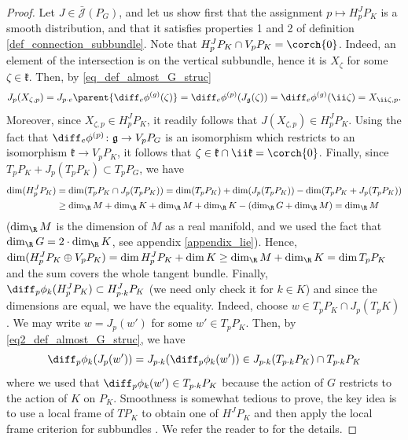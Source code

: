 \begin{proof}
    Let \(J \in \bar{\mathscr{J}}(P_G)\), and let us show first that the assignment \(p \mapsto H^J_pP_K\) is a smooth distribution, and that it satisfies properties 1 and 2 of definition \ref{def_connection_subbundle}. Note that \(H^J_pP_K \cap V_pP_K=\corch{0}\). Indeed, an element of the intersection is on the vertical subbundle, hence it is \(X_\zeta\) for some \(\zeta \in \mathfrak{k}\). Then, by \eqref{eq_def_almost_G_struc}
    \[
    J_p(X_{\zeta,p})= J_{p\cdot e}\parent{\diff_e\phi^{(g)}(\zeta)}=\diff_e\phi^{(p)}(J_\mathfrak{g}(\zeta)) =\diff_e\phi^{(g)}(\ii \zeta) =X_{\ii \zeta,p}.
    \]
    Moreover, since \(X_{\zeta,p} \in H^J_p P_K\), it readily follows that \(J(X_{\zeta,p})\in H_p^J P_K\). Using the fact that \(\diff_e\phi^{(p)}\colon \mathfrak{g}\to V_pP_G\) is an isomorphism which restricts to an isomorphism \(\mathfrak{k}\to V_pP_K\), it follows that \(\zeta \in \mathfrak{k} \cap \ii \mathfrak{k}=\corch{0}\). Finally, since \(T_pP_K+J_p(T_pP_K)\subset T_pP_G\), we have
    \begin{equation} \label{eq_dim_horiz}
        \begin{split}
        \dim (H^J_pP_K) &= \dim(T_pP_K \cap J_p(T_pP_K)) = \dim(T_pP_K) + \dim(J_p(T_pP_K))-\dim(T_pP_K+J_p(T_pP_K)) \\
        & \geq \dim_\R M + \dim_\R K+ \dim_\R M+\dim_\R K- (\dim_\R G +\dim_\R M) =\dim _\R M 
        \end{split}
    \end{equation} 
    (\(\dim_\R M\) is the dimension of \(M\) as a real manifold, and we used the fact that \(\dim_\R G=2\cdot \dim_\R K\), see appendix \ref{appendix_lie}). Hence, \(\dim (H^J_pP_K \oplus V_pP_K)= \dim H^J_pP_K+\dim K\geq \dim_\R M+\dim_\R K=\dim T_pP_K\) and the sum covers the whole tangent bundle. Finally, \(\diff_p\phi_k(H^J_pP_K)\subset H^J_{p\cdot k}P_K\) (we need only check it for \(k \in K\)) and since the dimensions are equal, we have the equality. Indeed, choose \(w\in T_pP_K \cap J_p(T_pK)\). We may write \(w=J_p(w')\) for some \(w'\in T_pP_K\). Then, by \eqref{eq2_def_almost_G_struc}, we have
    \[
    \diff_p\phi_k(J_p(w'))=J_{p\cdot k}(\diff_p\phi_k(w'))\in J_{p\cdot k}(T_{p\cdot k}P_K)\cap T_{p\cdot k}P_K
    \]
    where we used that \(\diff_p\phi_k(w')\in T_{p\cdot k}P_K\) because the action of \(G\) restricts to the action of \(K\) on \(P_K\).
    Smoothness is somewhat tedious to prove, the key idea is to use a local frame of \(TP_K\) to obtain one of \(H^JP_K\) and then apply the local frame criterion for subbundles \parencite[Lemma 10.32]{lee_introSM}. We refer the reader to \parencite[Th. 3.1.1]{Sandon_Chern_Correspondence} for the details. 


\end{proof}
